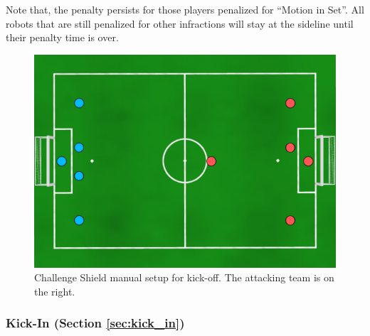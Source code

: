 Note that, the penalty persists for those players penalized for ``Motion in Set''. All robots that are still penalized for other infractions will stay at the sideline until their penalty time is over.

\begin{figure}[t]
\centerline{\includegraphics[width=\columnwidth]{figs/manual-placement-cs.pdf}}
\caption{Challenge Shield manual setup for kick-off.  The attacking team is on the right.}
\label{fig:ko-manual}
\end{figure}

%

\subsubsection{Kick-In (Section \ref{sec:kick_in})}

